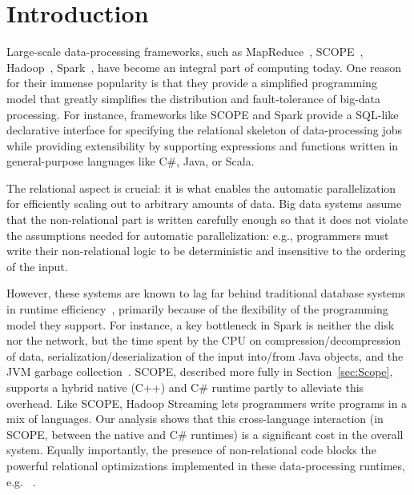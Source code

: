\section{Introduction \label{sec:intro}}
Large-scale data-processing frameworks, such as MapReduce~\cite{MapReduce}, SCOPE~\cite{SCOPE}, Hadoop~\cite{Dittrich:2010}, Spark~\cite{zaharia2010spark}, have become an integral part of computing today. One reason for their immense popularity is that they provide a simplified programming model that greatly simplifies the distribution and fault-tolerance of big-data processing. For instance, frameworks like SCOPE and Spark provide a SQL-like declarative interface for specifying the relational skeleton of data-processing jobs while providing extensibility by supporting expressions and functions written in general-purpose languages like C\#, Java, or Scala. 

The relational aspect is crucial: it is what enables the automatic parallelization for efficiently scaling out to arbitrary amounts of data.
Big data systems assume that the non-relational part is written carefully enough so that it does not violate the assumptions needed for automatic parallelization: e.g., programmers must write their non-relational logic to be deterministic and insensitive to the ordering of the input.

However, these systems are known to lag far behind traditional database systems in runtime efficiency~\cite{Jahani:2011,Pavlo:2009}, primarily because of the flexibility of the programming model they support. For instance,  a key bottleneck in Spark is neither the disk nor the network, but the time spent by the CPU on compression/decompression of data, serialization/deserialization of the input into/from Java objects, and the JVM garbage collection~\cite{ousterhout-nsdi15}. SCOPE,  described more fully in Section~\ref{sec:Scope}, supports a hybrid native (C++) and C\# runtime partly to alleviate this overhead.
Like SCOPE, Hadoop Streaming lets programmers write programs in a mix of languages\cite{hadoop_stream}. 
Our analysis shows that this cross-language interaction (in SCOPE, between the native and C\# runtimes) is a significant cost in the overall system.  
Equally importantly, the presence of non-relational code blocks the powerful relational optimizations implemented in these data-processing runtimes, e.g. ~\cite{guo2012spotting}. 



